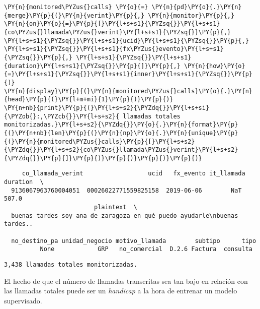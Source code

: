     \begin{tcolorbox}[breakable, size=fbox, boxrule=1pt, pad at break*=1mm,colback=cellbackground, colframe=cellborder]
\begin{Verbatim}[commandchars=\\\{\}]
\PY{n}{monitored\PYZus{}calls} \PY{o}{=} \PY{n}{pd}\PY{o}{.}\PY{n}{merge}\PY{p}{(}\PY{n}{verint}\PY{p}{,} \PY{n}{monitor}\PY{p}{,} \PY{n}{on}\PY{o}{=}\PY{p}{[}\PY{l+s+s1}{\PYZsq{}}\PY{l+s+s1}{co\PYZus{}llamada\PYZus{}verint}\PY{l+s+s1}{\PYZsq{}}\PY{p}{,} \PY{l+s+s1}{\PYZsq{}}\PY{l+s+s1}{ucid}\PY{l+s+s1}{\PYZsq{}}\PY{p}{,} \PY{l+s+s1}{\PYZsq{}}\PY{l+s+s1}{fx\PYZus{}evento}\PY{l+s+s1}{\PYZsq{}}\PY{p}{,} \PY{l+s+s1}{\PYZsq{}}\PY{l+s+s1}{duration}\PY{l+s+s1}{\PYZsq{}}\PY{p}{]}\PY{p}{,} \PY{n}{how}\PY{o}{=}\PY{l+s+s1}{\PYZsq{}}\PY{l+s+s1}{inner}\PY{l+s+s1}{\PYZsq{}}\PY{p}{)}
\PY{n}{display}\PY{p}{(}\PY{n}{monitored\PYZus{}calls}\PY{o}{.}\PY{n}{head}\PY{p}{(}\PY{l+m+mi}{1}\PY{p}{)}\PY{p}{)}
\PY{n+nb}{print}\PY{p}{(}\PY{l+s+s2}{\PYZdq{}}\PY{l+s+si}{\PYZob{}:,\PYZcb{}}\PY{l+s+s2}{ llamadas totales monitorizadas.}\PY{l+s+s2}{\PYZdq{}}\PY{o}{.}\PY{n}{format}\PY{p}{(}\PY{n+nb}{len}\PY{p}{(}\PY{n}{np}\PY{o}{.}\PY{n}{unique}\PY{p}{(}\PY{n}{monitored\PYZus{}calls}\PY{p}{[}\PY{l+s+s2}{\PYZdq{}}\PY{l+s+s2}{co\PYZus{}llamada\PYZus{}verint}\PY{l+s+s2}{\PYZdq{}}\PY{p}{]}\PY{p}{)}\PY{p}{)}\PY{p}{)}\PY{p}{)}
\end{Verbatim}
\end{tcolorbox}

    
    \begin{verbatim}
     co_llamada_verint                  ucid   fx_evento it_llamada  duration  \
  9136067963760004051  00026022771559825158  2019-06-06        NaT     507.0   
                         plaintext  \
  buenas tardes soy ana de zaragoza en qué puedo ayudarle\nbuenas tardes..

  no_destino_pa unidad_negocio motivo_llamada        subtipo      tipo  
          None            GRP   no_comercial  D.2.6 Factura  consulta  
    \end{verbatim}

    
    \begin{Verbatim}[commandchars=\\\{\}]
3,438 llamadas totales monitorizadas.
    \end{Verbatim}

    El hecho de que el número de llamadas transcritas sea tan bajo en
relación con las llamadas totales puede ser un \textit{handicap} a la hora de entrenar un modelo supervisado.

